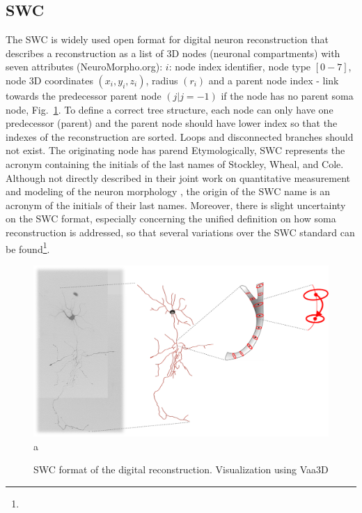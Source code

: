 \subsection{SWC} 
%
The SWC \cite{cannon1998line} is widely used open format for digital neuron reconstruction that describes a reconstruction as a list of 3D nodes (neuronal compartments) with seven attributes (NeuroMorpho.org):  $i$: node index identifier, node type $[0-7]$, node 3D coordinates $(x_i,y_i,z_i)$, radius $(r_i)$ and a parent node index - link towards the predecessor parent node $(j | j=-1)$ if the node has no parent soma node, Fig.~\ref{ch1__fig5}. To define a correct tree structure, each node can only have one predecessor (parent) and the parent node should have lower index so that the indexes of the reconstruction are sorted. Loops and disconnected branches should not exist. The originating node has parend  Etymologically, SWC represents the acronym containing the initials of the last names of Stockley, Wheal, and Cole. Although not directly described in their joint work on quantitative measurement and modeling of the neuron morphology \cite{stockley1993system}, the origin of the SWC name is an acronym of the initials of their last names. Moreover, there is slight uncertainty on the SWC format, especially concerning the unified definition on how soma reconstruction is addressed, so that several variations over the SWC standard can be found\footnote{}.
\begin{figure}
	\begin{center}
		\includegraphics[width=\textwidth]{ch1_fig5} \\
		a 
	\end{center}
	\vspace{-3ex}
	\caption{SWC format of the digital reconstruction. Visualization using Vaa3D \cite{peng2010automatic}}
	\vspace{-1ex}
	\label{ch1__fig5}
\end{figure}

